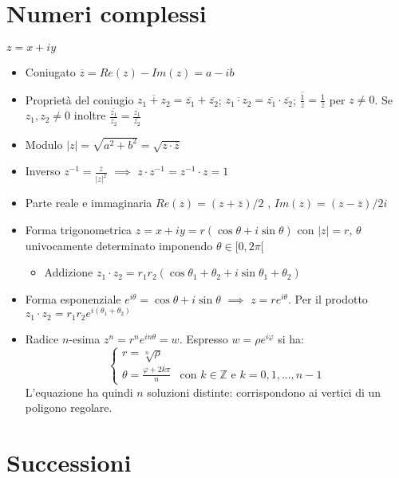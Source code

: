 \documentclass[10pt]{article}
\theoremstyle{plain}
\begin{document}
\section{Numeri complessi}
$z = x + iy$
\begin{itemize}
    \item Coniugato $\overline{z} = Re (z) - Im (z) = a -ib$
    \item Proprietà del coniugio $\overline{z_1 + z_2} = \overline{z_1} + \overline{z_2}$; $\overline{z_1 \cdot z_2} = \overline{z_1} \cdot \overline{z_2}$; $\overline{\frac{1}{z}} = \frac{1}{\overline{z}}$ per $z \neq 0$. Se $z_1, z_2 \neq 0$ inoltre $\overline{\frac{z_1}{z_2}} = \frac{\overline{z_1}}{\overline{z_2}}$
    \item Modulo $|z| = \sqrt{a^2 + b^2} = \sqrt{z \cdot \overline{z}}$
    \item Inverso $z^{-1} = \frac{\overline{z}}{|z|^2}$ $\implies$ $z \cdot z^{-1} = z^{-1} \cdot z = 1$
    \item Parte reale e immaginaria $Re(z) = (z + \overline{z}) / 2$ , $Im (z) = (z - \overline{z}) / 2i$
    \item Forma trigonometrica $z = x + iy = r (\cos \theta + i \sin \theta)$ con $|z| = r$, $\theta$ univocamente determinato imponendo $\theta \in [0, 2\pi[$
    \begin{itemize}[label = $\ast$]
        \item Addizione $z_1 \cdot z_2 = r_1 r_2 (\cos{\theta_1 + \theta_2} + i \sin{\theta_1 + \theta_2})$
    \end{itemize}
    \item Forma esponenziale $e^{i \theta} = \cos \theta + i \sin \theta$ $\implies$ $z = r e^{i\theta}$. Per il prodotto $z_1 \cdot z_2 = r_1 r_2 e^{i (\theta_1 + \theta_2)}$
    \item Radice $n$-esima $z^n = r^n e^{i n\theta} = w$. Espresso $w = \rho e^{i \varphi}$ si ha:
    \[\begin{cases}
        r = \sqrt[n]{\rho} \\
        \theta = \frac{\varphi + 2 k \pi}{n} & \textrm{con $k \in \mathbb{Z}$ e $k = 0, 1, ..., n-1$}
    \end{cases}\]
    L'equazione ha quindi $n$ soluzioni distinte: corrispondono ai vertici di un poligono regolare.
\end{itemize}

\section{Successioni}
\end{document}

